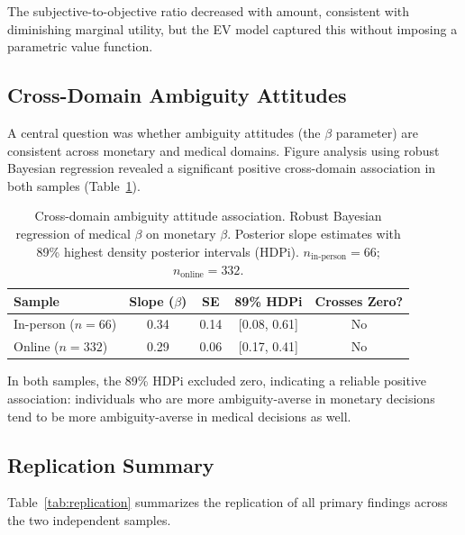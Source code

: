 \documentclass[11pt]{article}
\begin{document}
The subjective-to-objective ratio decreased with amount, consistent with diminishing marginal utility, but the EV model captured this without imposing a parametric value function.

\subsection{Cross-Domain Ambiguity Attitudes}

A central question was whether ambiguity attitudes (the $\beta$ parameter) are consistent across monetary and medical domains. Figure analysis using robust Bayesian regression revealed a significant positive cross-domain association in both samples (Table~\ref{tab:ambiguity}).

\begin{table}[H]
\centering
\caption{Cross-domain ambiguity attitude association. Robust Bayesian regression of medical $\beta$ on monetary $\beta$. Posterior slope estimates with 89\% highest density posterior intervals (HDPi). $n_{\text{in-person}} = 66$; $n_{\text{online}} = 332$.}
\label{tab:ambiguity}
\begin{tabular}{lcccc}
\toprule
\textbf{Sample} & \textbf{Slope ($\beta$)} & \textbf{SE} & \textbf{89\% HDPi} & \textbf{Crosses Zero?} \\
\midrule
In-person ($n = 66$) & 0.34 & 0.14 & [0.08, 0.61] & No \\
Online ($n = 332$) & 0.29 & 0.06 & [0.17, 0.41] & No \\
\bottomrule
\end{tabular}
\end{table}

In both samples, the 89\% HDPi excluded zero, indicating a reliable positive association: individuals who are more ambiguity-averse in monetary decisions tend to be more ambiguity-averse in medical decisions as well.

\subsection{Replication Summary}

Table~\ref{tab:replication} summarizes the replication of all primary findings across the two independent samples.
\end{document}
